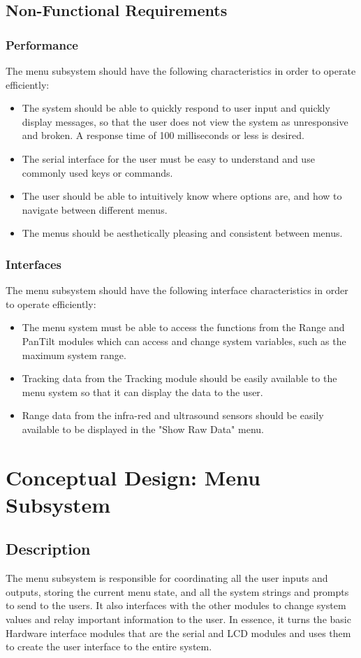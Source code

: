 \documentclass[]{report}
\begin{document}
\subsection{Non-Functional Requirements}
\subsubsection{Performance}
The menu subsystem should have the following characteristics in order to operate efficiently:
\begin{itemize}
	\item The system should be able to quickly respond to user input and quickly display messages, so that the user does not view the system as unresponsive and broken. A response time of 100 milliseconds or less is desired. 
	\item The serial interface for the user must be easy to understand and use commonly used keys or commands. 
	\item The user should be able to intuitively know where options are, and how to navigate between different menus.
	\item The menus should be aesthetically pleasing and consistent between menus. 
\end{itemize}

\subsubsection{Interfaces}
The menu subsystem should have the following interface characteristics in order to operate efficiently:
\begin{itemize}
	\item The menu system must be able to access the functions from the Range and PanTilt modules which can access and change system variables, such as the maximum system range. 
	\item Tracking data from the Tracking module should be easily available to the menu system so that it can display the data to the user.
	\item Range data from the infra-red and ultrasound sensors should be easily available to be displayed in the "Show Raw Data" menu. 
\end{itemize}

\section{Conceptual Design: Menu Subsystem}
\subsection{Description}
The menu subsystem is responsible for coordinating all the user inputs and outputs, storing the current menu state, and all the system strings and prompts to send to the users. It also interfaces with the other modules to change system values and relay important information to the user. In essence, it turns the basic Hardware interface modules that are the serial and LCD modules and uses them to create the user interface to the entire system.
\end{document}

